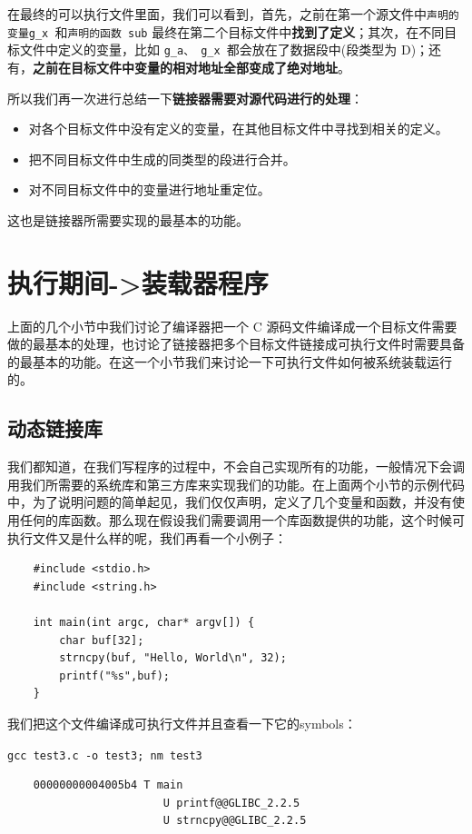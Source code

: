 \documentclass[UTF8,a4paper,12pt]{ctexbook}
\begin{document}
				在最终的可以执行文件里面，我们可以看到，首先，之前在第一个源文件中\verb|声明的变量g_x |和\verb|声明的函数 sub| 最终在第二个目标文件中\textbf{找到了定义}；其次，在不同目标文件中定义的变量，比如 \verb|g_a、 g_x |都会放在了数据段中(段类型为 D)；还有，\textbf{之前在目标文件中变量的相对地址全部变成了绝对地址}。
				
				所以我们再一次进行总结一下\textbf{链接器需要对源代码进行的处理}：
				\begin{itemize}[itemindent = 1em]
					\item 对各个目标文件中没有定义的变量，在其他目标文件中寻找到相关的定义。
					\item 把不同目标文件中生成的同类型的段进行合并。
					\item 对不同目标文件中的变量进行地址重定位。
				\end{itemize}
				
				这也是链接器所需要实现的最基本的功能。
				
	\section{执行期间->装载器程序}
		上面的几个小节中我们讨论了编译器把一个 C 源码文件编译成一个目标文件需要做的最基本的处理，也讨论了链接器把多个目标文件链接成可执行文件时需要具备的最基本的功能。在这一个小节我们来讨论一下可执行文件如何被系统装载运行的。
		
		\subsection{动态链接库}
			我们都知道，在我们写程序的过程中，不会自己实现所有的功能，一般情况下会调用我们所需要的系统库和第三方库来实现我们的功能。在上面两个小节的示例代码中，为了说明问题的简单起见，我们仅仅声明，定义了几个变量和函数，并没有使用任何的库函数。那么现在假设我们需要调用一个库函数提供的功能，这个时候可执行文件又是什么样的呢，我们再看一个小例子：
			
			\begin{lstlisting}
	#include <stdio.h>
	#include <string.h>
	
	int main(int argc, char* argv[]) {
		char buf[32];
		strncpy(buf, "Hello, World\n", 32);
		printf("%s",buf);
	}
			\end{lstlisting}
		
			我们把这个文件编译成可执行文件并且查看一下它的symbols：
			
			\verb|gcc test3.c -o test3; nm test3|
			\begin{lstlisting}
	00000000004005b4 T main
						U printf@@GLIBC_2.2.5
						U strncpy@@GLIBC_2.2.5		
			\end{lstlisting}
			
\end{document}
